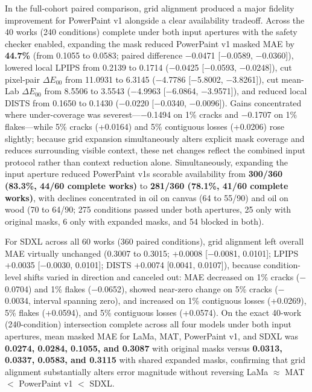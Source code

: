 \documentclass[fleqn,12pt,lineno]{wlpeerj}
\begin{document}


In the full-cohort paired comparison, grid alignment produced a major fidelity improvement for PowerPaint v1 alongside a clear availability tradeoff. Across the 40 works (240 conditions) complete under both input apertures with the safety checker enabled, expanding the mask reduced PowerPaint v1 masked MAE by \textbf{44.7\%} (from 0.1055 to 0.0583; paired difference \ensuremath{-}0.0471 {[}\ensuremath{-}0.0589, \ensuremath{-}0.0360{]}), lowered local LPIPS from 0.2139 to 0.1714 (\ensuremath{-}0.0425 {[}\ensuremath{-}0.0593, \ensuremath{-}0.0248{]}), cut pixel-pair \texttt{\ensuremath{\Delta E_{00}}} from 11.0931 to 6.3145 (\ensuremath{-}4.7786 {[}\ensuremath{-}5.8002, \ensuremath{-}3.8261{]}), cut mean-Lab \texttt{\ensuremath{\Delta E_{00}}} from 8.5506 to 3.5543 (\ensuremath{-}4.9963 {[}\ensuremath{-}6.0864, \ensuremath{-}3.9571{]}), and reduced local DISTS from 0.1650 to 0.1430 (\ensuremath{-}0.0220 {[}\ensuremath{-}0.0340, \ensuremath{-}0.0096{]}). Gains concentrated where under-coverage was severest---\ensuremath{-}0.1494 on 1\% cracks and \ensuremath{-}0.1707 on 1\% flakes---while 5\% cracks (+0.0164) and 5\% contiguous losses (+0.0206) rose slightly; because grid expansion simultaneously alters explicit mask coverage and reduces surrounding visible context, these net changes reflect the combined input protocol rather than context reduction alone. Simultaneously, expanding the input aperture reduced PowerPaint v1\textquotesingle s scorable availability from \textbf{300/360 (83.3\%, 44/60 complete works)} to \textbf{281/360 (78.1\%, 41/60 complete works)}, with declines concentrated in oil on canvas (64 to 55/90) and oil on wood (70 to 64/90; 275 conditions passed under both apertures, 25 only with original masks, 6 only with expanded masks, and 54 blocked in both).

For SDXL across all 60 works (360 paired conditions), grid alignment left overall MAE virtually unchanged (0.3007 to 0.3015; +0.0008 {[}\ensuremath{-}0.0081, 0.0101{]}; LPIPS +0.0035 {[}\ensuremath{-}0.0030, 0.0101{]}; DISTS +0.0074 {[}0.0041, 0.0107{]}), because condition-level shifts varied in direction and canceled out: MAE decreased on 1\% cracks (\ensuremath{-}0.0704) and 1\% flakes (\ensuremath{-}0.0652), showed near-zero change on 5\% cracks (\ensuremath{-}0.0034, interval spanning zero), and increased on 1\% contiguous losses (+0.0269), 5\% flakes (+0.0594), and 5\% contiguous losses (+0.0574). On the exact 40-work (240-condition) intersection complete across all four models under both input apertures, mean masked MAE for LaMa, MAT, PowerPaint v1, and SDXL was \textbf{0.0274, 0.0284, 0.1055, and 0.3087} with original masks versus \textbf{0.0313, 0.0337, 0.0583, and 0.3115} with shared expanded masks, confirming that grid alignment substantially alters error magnitude without reversing LaMa \(\approx\) MAT \(\!<\!\) PowerPaint v1 \(\!<\!\) SDXL.
\end{document}
